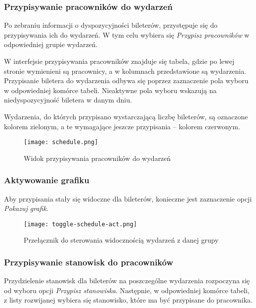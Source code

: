 \documentclass[shortabstract]{iithesis}
\begin{document}
\subsubsection{Przypisywanie pracowników do wydarzeń}

Po zebraniu informacji o dyspozycyjności bileterów, przystępuje się do przypisywania ich do wydarzeń. W tym celu wybiera się \textit{Przypisz pracowników} w odpowiedniej grupie wydarzeń.

W interfejsie przypisywania pracowników znajduje się tabela, gdzie po lewej stronie wymienieni są pracownicy, a w kolumnach przedstawione są wydarzenia. Przypisanie biletera do wydarzenia odbywa się poprzez zaznaczenie pola wyboru w odpowiedniej komórce tabeli. Nieaktywne pola wyboru wskazują na niedyspozycyjność biletera w danym dniu.

Wydarzenia, do których przypisano wystarczającą liczbę bileterów, są oznaczone kolorem zielonym, a te wymagające jeszcze przypisania – kolorem czerwonym.

\begin{figure}[H]
    \centering
    \texttt{[image: schedule.png]}
    \caption{Widok przypisywania pracowników do wydarzeń}
    \label{fig:enter-label}
\end{figure}

\subsubsection{Aktywowanie grafiku}

Aby przypisania stały się widoczne dla bileterów, konieczne jest zaznaczenie opcji \textit{Pokazuj grafik}.

\begin{figure}[H]
    \centering
    \texttt{[image: toggle-schedule-act.png]}
    \caption{Przełącznik do sterowania widocznością wydarzeń z danej grupy}
    \label{fig:enter-label}
\end{figure}


\subsubsection{Przypisywanie stanowisk do pracowników}

Przydzielenie stanowisk dla bileterów na poszczególne wydarzenia rozpoczyna się od wyboru opcji \textit{Przypisz stanowiska}. Następnie, w odpowiedniej komórce tabeli, z listy rozwijanej wybiera się stanowisko, które ma być przypisane do pracownika.
\end{document}
